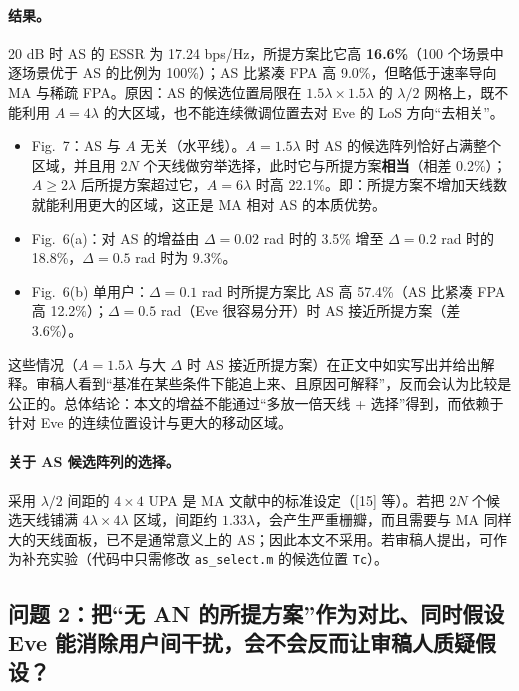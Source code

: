 \documentclass[11pt,a4paper]{ctexart}
\newcommand{\code}[1]{\texttt{#1}}
\begin{document}
\paragraph{结果。}
20 dB 时 AS 的 ESSR 为 17.24 bps/Hz，所提方案比它高 \textbf{16.6\%}（100 个场景中逐场景优于 AS 的比例为 100\%）；AS 比紧凑 FPA 高 9.0\%，但略低于速率导向 MA 与稀疏 FPA。原因：AS 的候选位置局限在 $1.5\lambda\times1.5\lambda$ 的 $\lambda/2$ 网格上，既不能利用 $A=4\lambda$ 的大区域，也不能连续微调位置去对 Eve 的 LoS 方向“去相关”。
\begin{itemize}
\item Fig.~7：AS 与 $A$ 无关（水平线）。$A=1.5\lambda$ 时 AS 的候选阵列恰好占满整个区域，并且用 $2N$ 个天线做穷举选择，此时它与所提方案\textbf{相当}（相差 0.2\%）；$A\ge2\lambda$ 后所提方案超过它，$A=6\lambda$ 时高 22.1\%。即：所提方案不增加天线数就能利用更大的区域，这正是 MA 相对 AS 的本质优势。
\item Fig.~6(a)：对 AS 的增益由 $\Delta=0.02$ rad 时的 3.5\% 增至 $\Delta=0.2$ rad 时的 18.8\%，$\Delta=0.5$ rad 时为 9.3\%。
\item Fig.~6(b) 单用户：$\Delta=0.1$ rad 时所提方案比 AS 高 57.4\%（AS 比紧凑 FPA 高 12.2\%）；$\Delta=0.5$ rad（Eve 很容易分开）时 AS 接近所提方案（差 3.6\%）。
\end{itemize}
这些情况（$A=1.5\lambda$ 与大 $\Delta$ 时 AS 接近所提方案）在正文中如实写出并给出解释。审稿人看到“基准在某些条件下能追上来、且原因可解释”，反而会认为比较是公正的。总体结论：本文的增益不能通过“多放一倍天线 + 选择”得到，而依赖于针对 Eve 的连续位置设计与更大的移动区域。

\paragraph{关于 AS 候选阵列的选择。}采用 $\lambda/2$ 间距的 $4\times4$ UPA 是 MA 文献中的标准设定（[15] 等）。若把 $2N$ 个候选天线铺满 $4\lambda\times4\lambda$ 区域，间距约 $1.33\lambda$，会产生严重栅瓣，而且需要与 MA 同样大的天线面板，已不是通常意义上的 AS；因此本文不采用。若审稿人提出，可作为补充实验（代码中只需修改 \code{as\_select.m} 的候选位置 \code{Tc}）。

\subsection{问题 2：把“无 AN 的所提方案”作为对比、同时假设 Eve 能消除用户间干扰，会不会反而让审稿人质疑假设？}
\end{document}
